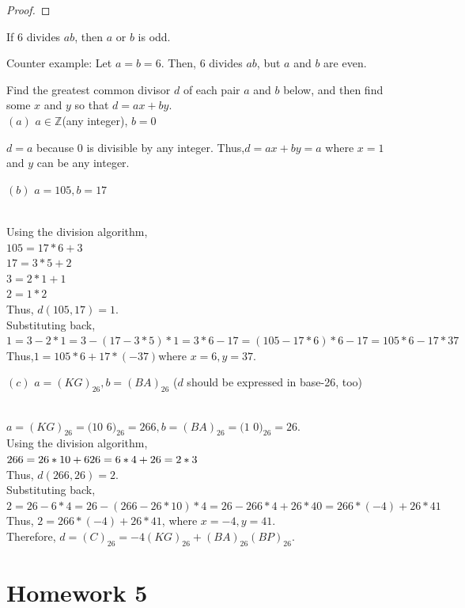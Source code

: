 \begin{problem}
\begin{proof}
\end{proof}
\begin{problem}If $6$ divides $ab$, then $a$ or $b$ is odd.
\end{problem}
\solution
Counter example: Let $a=b=6$. Then, $6$ divides $ab$, but $a$ and $b$ are even. 
\begin{problem}Find the greatest common divisor $d$ of each pair $a$ and $b$ below, and then find some $x$ and $y$ so that $d=ax+by$.\\
$(a)$ $a \in \mathbb{Z}$(any integer), $b=0$
\end{problem}
\solution 
$d=a$ because $0$ is divisible by any integer. 
Thus,$d=ax+by=a$ where $x=1$ and $y$ can be any integer. 
\begin{problem}
$(b)$ $a=105,b=17$
\end{problem}
\solution 
\\Using the division algorithm,
\\$105=17*6+3$
\\$17=3*5+2$
\\$3=2*1+1$
\\$2=1*2$ 
\\Thus, $d(105,17)=1$. 
\\Substituting back, 
\\$1=3-2*1=3-(17-3*5)*1=3*6-17= (105-17*6)*6-17=105*6-17*37$
\\Thus,$1=105*6+17*(-37)$where $x=6,y=37$.
\begin{problem}
$(c)$ $a = (KG)_{26}, b = (BA)_{26}$ ($d$ should be expressed in base-26, too)
\end{problem}
\solution
\\$a=(KG)_{26} = (10$ $6)_{26}=266, b=(BA)_{26} = (1$ $0)_{26}=26$. 
\\Using the division algorithm, 
\\$266=26*10+6
\\26=6*4+2
\\6=2*3$
\\Thus, $d(266,26)=2$. 
\\Substituting back, 
\\$2=26-6*4= 26-(266-26*10)*4 = 26-266*4+26*40=266*(-4) + 26*41$
\\Thus, $2=266*(-4)+26*41$, where $x=-4,y=41$. 
\\Therefore, $d=(C)_{26}=-4(KG)_{26}+(BA)_{26}(BP)_{26}$. 
\section{Homework 5}


\end{problem}
